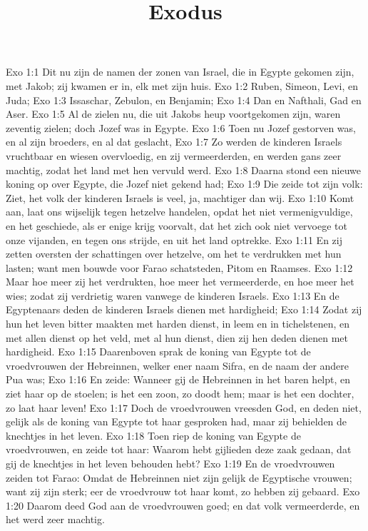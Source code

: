 

\title{Exodus}


Exo 1:1  Dit nu zijn de namen der zonen van Israel, die in Egypte gekomen zijn, met Jakob; zij kwamen er in, elk met zijn huis.
Exo 1:2  Ruben, Simeon, Levi, en Juda;
Exo 1:3  Issaschar, Zebulon, en Benjamin;
Exo 1:4  Dan en Nafthali, Gad en Aser.
Exo 1:5  Al de zielen nu, die uit Jakobs heup voortgekomen zijn, waren zeventig zielen; doch Jozef was in Egypte.
Exo 1:6  Toen nu Jozef gestorven was, en al zijn broeders, en al dat geslacht,
Exo 1:7  Zo werden de kinderen Israels vruchtbaar en wiesen overvloedig, en zij vermeerderden, en werden gans zeer machtig, zodat het land met hen vervuld werd.
Exo 1:8  Daarna stond een nieuwe koning op over Egypte, die Jozef niet gekend had;
Exo 1:9  Die zeide tot zijn volk: Ziet, het volk der kinderen Israels is veel, ja, machtiger dan wij.
Exo 1:10  Komt aan, laat ons wijselijk tegen hetzelve handelen, opdat het niet vermenigvuldige, en het geschiede, als er enige krijg voorvalt, dat het zich ook niet vervoege tot onze vijanden, en tegen ons strijde, en uit het land optrekke.
Exo 1:11  En zij zetten oversten der schattingen over hetzelve, om het te verdrukken met hun lasten; want men bouwde voor Farao schatsteden, Pitom en Raamses.
Exo 1:12  Maar hoe meer zij het verdrukten, hoe meer het vermeerderde, en hoe meer het wies; zodat zij verdrietig waren vanwege de kinderen Israels.
Exo 1:13  En de Egyptenaars deden de kinderen Israels dienen met hardigheid;
Exo 1:14  Zodat zij hun het leven bitter maakten met harden dienst, in leem en in tichelstenen, en met allen dienst op het veld, met al hun dienst, dien zij hen deden dienen met hardigheid.
Exo 1:15  Daarenboven sprak de koning van Egypte tot de vroedvrouwen der Hebreinnen, welker ener naam Sifra, en de naam der andere Pua was;
Exo 1:16  En zeide: Wanneer gij de Hebreinnen in het baren helpt, en ziet haar op de stoelen; is het een zoon, zo doodt hem; maar is het een dochter, zo laat haar leven!
Exo 1:17  Doch de vroedvrouwen vreesden God, en deden niet, gelijk als de koning van Egypte tot haar gesproken had, maar zij behielden de knechtjes in het leven.
Exo 1:18  Toen riep de koning van Egypte de vroedvrouwen, en zeide tot haar: Waarom hebt gijlieden deze zaak gedaan, dat gij de knechtjes in het leven behouden hebt?
Exo 1:19  En de vroedvrouwen zeiden tot Farao: Omdat de Hebreinnen niet zijn gelijk de Egyptische vrouwen; want zij zijn sterk; eer de vroedvrouw tot haar komt, zo hebben zij gebaard.
Exo 1:20  Daarom deed God aan de vroedvrouwen goed; en dat volk vermeerderde, en het werd zeer machtig.
